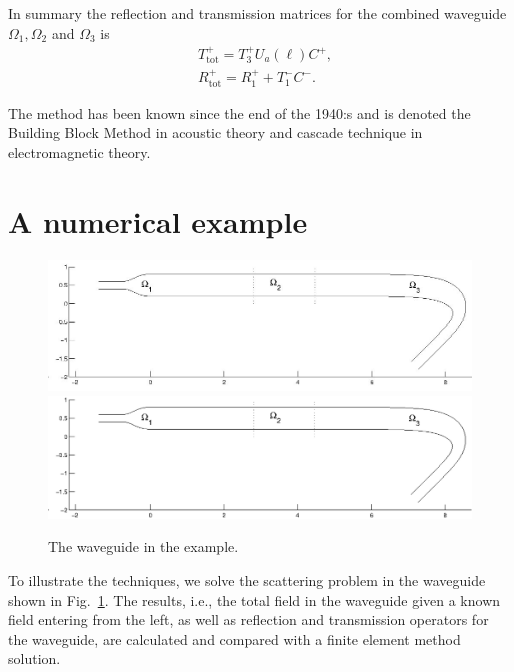 \documentclass[numreferences]{kluwer}
\newcommand{\Ttot}{T^+_{\text{tot}}}
\newcommand{\Rtot}{R^+_{\text{tot}}}
\begin{document}
In summary the reflection and transmission matrices for the combined waveguide $\Omega_1, \Omega_2$ and $\Omega_3$ is
\begin{equation}
  \label{eq:ABRtotTtot2}
  \begin{split}
    &\Ttot=T_3^{+}U_a(\ell)C^+,\\
    &\Rtot=R_1^{+}+T_1^{-}C^-.
  \end{split}
\end{equation}



The method has been known since the end of the 1940:s
\cite{kerns1949} and is denoted the Building Block Method
\cite{nilssonbrander1981b} in acoustic theory and cascade technique
\cite{jones1986} in electromagnetic theory.



\section{A numerical example}
\label{sec:numerical-example}
\begin{figure}[htb]
  \centering \ifpdf
  \includegraphics[width=\textwidth]{waveguide.jpg}
  \else
  \includegraphics[width=\textwidth]{waveguide.eps}
  \fi
  \caption{The waveguide in the example.}
  \label{fig:exwg}
\end{figure}
To illustrate the techniques, we solve the scattering problem 
in the waveguide shown in Fig.~\ref{fig:exwg}.
The results, i.e., the total field in the waveguide given a known
field entering from the left, as well as reflection and transmission
operators for the waveguide, are calculated and compared with a finite
element method solution.
\end{document}
